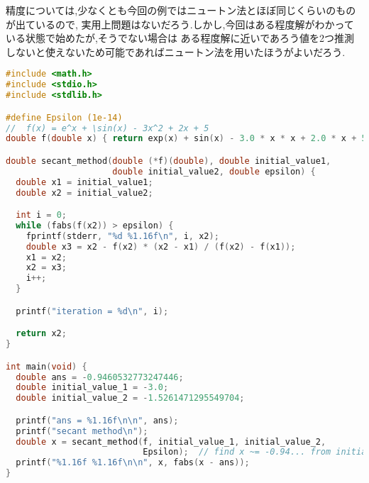 \documentclass[autodetect-engine, dvi=dvipdfmx, 10pt, a4paper, ja=standard]{bxjsarticle}
\begin{document}
精度については,少なくとも今回の例ではニュートン法とほぼ同じくらいのものが出ているので,
実用上問題はないだろう.しかし,今回はある程度解がわかっている状態で始めたが,そうでない場合は
ある程度解に近いであろう値を2つ推測しないと使えないため可能であればニュートン法を用いたほうがよいだろう.



\begin{lstlisting}[language={C}, caption={課題7で使用したソースコード}, label={code:ex-7}]
#include <math.h>
#include <stdio.h>
#include <stdlib.h>

#define Epsilon (1e-14)
// 	f(x) = e^x + \sin(x) - 3x^2 + 2x + 5
double f(double x) { return exp(x) + sin(x) - 3.0 * x * x + 2.0 * x + 5.0; }

double secant_method(double (*f)(double), double initial_value1,
					 double initial_value2, double epsilon) {
  double x1 = initial_value1;
  double x2 = initial_value2;

  int i = 0;
  while (fabs(f(x2)) > epsilon) {
	fprintf(stderr, "%d %1.16f\n", i, x2);
	double x3 = x2 - f(x2) * (x2 - x1) / (f(x2) - f(x1));
	x1 = x2;
	x2 = x3;
	i++;
  }

  printf("iteration = %d\n", i);

  return x2;
}

int main(void) {
  double ans = -0.9460532773247446;
  double initial_value_1 = -3.0;
  double initial_value_2 = -1.5261471295549704;

  printf("ans = %1.16f\n\n", ans);
  printf("secant method\n");
  double x = secant_method(f, initial_value_1, initial_value_2,
						   Epsilon);  // find x ~= -0.94... from initial_value
  printf("%1.16f %1.16f\n\n", x, fabs(x - ans));
}

\end{lstlisting}


\end{document}
